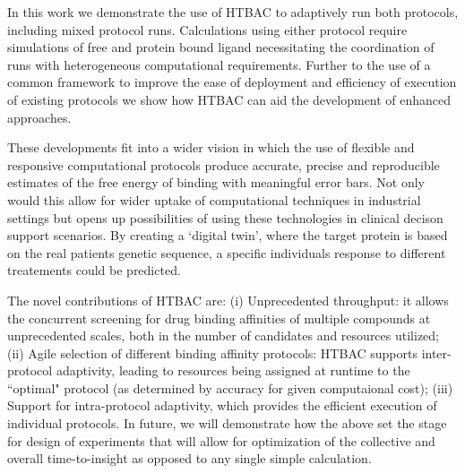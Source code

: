 In this work we demonstrate the use of HTBAC to adaptively run both protocols,
including mixed protocol runs. 
Calculations using either protocol require simulations of free and 
protein bound ligand necessitating the coordination of runs with 
heterogeneous computational requirements.
Further to the use of a common framework to improve the ease of deployment and
efficiency of execution of existing protocols we show how HTBAC can aid the
development of enhanced approaches. 


These developments fit into a wider vision in which the use of
flexible and responsive computational protocols produce accurate,
precise and reproducible estimates of the free energy of binding with meaningful error bars. Not only
would this allow for wider uptake of computational techniques in industrial
settings but opens up possibilities of using these technologies in clinical
decison support scenarios. By creating a `digital twin', where the target
protein is based on the real patients genetic sequence, a specific individuals
response to different treatements could be predicted. 


The novel contributions of HTBAC are: (i) Unprecedented throughput: it allows
the concurrent screening for drug binding affinities of multiple compounds at
unprecedented scales, both in the number of candidates and resources utilized;
(ii) Agile selection of different binding affinity protocols: HTBAC supports
inter-protocol adaptivity, leading to resources being assigned at runtime to
the ``optimal" protocol (as determined by accuracy for given computaional
cost); (iii) Support for intra-protocol adaptivity, which provides the
efficient execution of individual protocols. In future, we will demonstrate
how the above set the stage for design of experiments that will allow for
optimization of the collective and overall time-to-insight as opposed to any
single simple calculation.

